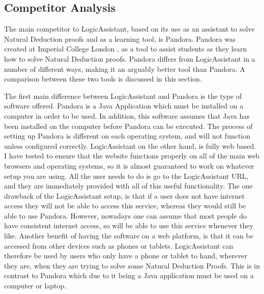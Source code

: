 \subsection{Competitor Analysis}

The main competitor to LogicAssistant, based on its use as an assistant to solve Natural Deduction proofs and as a learning tool, is Pandora. Pandora was created at Imperial College London \cite{pandora}, as a tool to assist students as they learn how to solve Natural Deduction proofs. Pandora differs from LogicAssistant in a number of different ways, making it an arguably better tool than Pandora. A comparison between these two tools is discussed in this section.

The first main difference between LogicAssistant and Pandora is the type of software offered. Pandora is a Java Application which must be installed on a computer in order to be used. In addition, this software assumes that Java has been installed on the computer before Pandora can be executed. The process of setting up Pandora is different on each operating system, and will not function unless configured correctly. LogicAssistant on the other hand, is fully web based. I have tested to ensure that the website functions properly on all of the main web browsers and operating systems, so it is almost guaranteed to work on whatever setup you are using. All the user needs to do is go to the LogicAssistant URL, and they are immediately provided with all of this useful functionality. The one drawback of the LogicAssistant setup, is that if a user does not have internet access they will not be able to access this service, whereas they would still be able to use Pandora. However, nowadays one can assume that most people do have consistent internet access, so will be able to use this service whenever they like. Another benefit of having the software on a web platform, is that it can be accessed from other devices such as phones or tablets. LogicAssistant can therefore be used by users who only have a phone or tablet to hand, wherever they are, when they are trying to solve some Natural Deduction Proofs. This is in contrast to Pandora which due to it being a Java application must be used on a computer or laptop.

